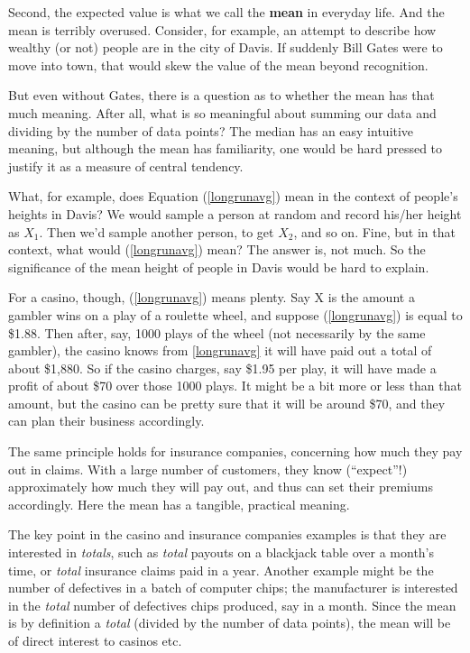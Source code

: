 Second, the expected value is what we call the {\bf mean} in everyday
life.  And the mean is terribly overused.  Consider, for example, an
attempt to describe how wealthy (or not) people are in the city of
Davis.  If suddenly Bill Gates were to move into town, that would skew
the value of the mean beyond recognition.  

But even without Gates, there is a question as to whether the mean has
that much meaning.  After all, what is so meaningful about summing our
data and dividing by the number of data points?  The median has an easy
intuitive meaning, but although the mean has familiarity, one would be
hard pressed to justify it as a measure of central tendency.

What, for example, does Equation (\ref{longrunavg}) mean in the context
of people's heights in Davis?  We would sample a person at random and
record his/her height as $X_1$.  Then we'd sample another person, to get
$X_2$, and so on.  Fine, but in that context, what would
(\ref{longrunavg}) mean?  The answer is, not much.  So the significance
of the mean height of people in Davis would be hard to explain.

For a casino, though, (\ref{longrunavg}) means plenty.  Say X is the
amount a gambler wins on a play of a roulette wheel, and suppose
(\ref{longrunavg}) is equal to \$1.88.  Then after, say, 1000 plays of
the wheel (not necessarily by the same gambler), the casino knows from
\ref{longrunavg} it will have paid out a total of about \$1,880.  So
if the casino charges, say \$1.95 per play, it will have made a profit
of about \$70 over those 1000 plays.  It might be a bit more or less
than that amount, but the casino can be pretty sure that it will be
around \$70, and they can plan their business accordingly.

The same principle holds for insurance companies, concerning how much
they pay out in claims.  With a large number of customers, they know
(``expect''!) approximately how much they will pay out, and thus can
set their premiums accordingly.  Here the mean has a tangible, practical
meaning.

The key point in the casino and insurance companies examples is that
they are interested in {\it totals}, such as {\it total} payouts on a
blackjack table over a month's time, or {\it total} insurance claims
paid in a year.  Another example might be the number of defectives in a
batch of computer chips; the manufacturer is interested in the {\it
total} number of defectives chips produced, say in a month.  Since the
mean is by definition a {\it total} (divided by the number of data
points), the mean will be of direct interest to casinos etc.

